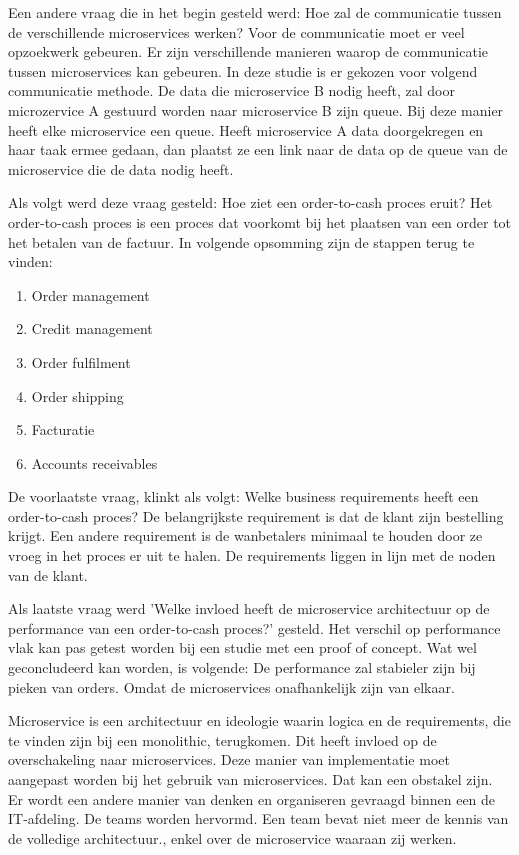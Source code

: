 Een andere vraag die in het begin gesteld werd: Hoe zal de communicatie tussen de verschillende microservices werken?
Voor de communicatie moet er veel opzoekwerk gebeuren. Er zijn verschillende manieren waarop de communicatie tussen microservices kan gebeuren. In deze studie is er gekozen voor volgend communicatie methode. De data die microservice B nodig heeft, zal door microzervice A gestuurd worden naar microservice B zijn queue. Bij deze manier heeft elke microservice een queue. Heeft microservice A data doorgekregen en haar taak ermee gedaan, dan plaatst ze een link naar de data op de queue van de microservice die de data nodig heeft. 

Als volgt werd deze vraag gesteld: Hoe ziet een order-to-cash proces eruit? 
Het order-to-cash proces is een proces dat voorkomt bij het plaatsen van een order tot het betalen van de factuur. In volgende opsomming zijn de stappen terug te vinden:
\begin{enumerate}
	\item Order management
	\item Credit management
	\item Order fulfilment
	\item Order shipping
	\item Facturatie
	\item Accounts receivables
\end{enumerate}

De voorlaatste vraag, klinkt als volgt: Welke business requirements heeft een order-to-cash proces?
De belangrijkste requirement is dat de klant zijn bestelling krijgt. Een andere requirement is de wanbetalers minimaal te houden door ze vroeg in het proces er uit te halen. De requirements liggen in lijn met de noden van de klant.

Als laatste vraag werd 'Welke invloed heeft de microservice architectuur op de performance van een order-to-cash proces?' gesteld.
Het verschil op performance vlak kan pas getest worden bij een studie met een proof of concept. Wat wel geconcludeerd kan worden, is volgende: De performance zal stabieler zijn bij pieken van orders. Omdat de microservices onafhankelijk zijn van elkaar.


Microservice is een architectuur en ideologie waarin logica en de requirements, die te vinden zijn bij een monolithic, terugkomen. Dit heeft invloed op de overschakeling naar microservices. Deze manier van implementatie moet aangepast worden bij het gebruik van microservices. Dat kan een obstakel zijn. Er wordt een andere manier van denken en organiseren gevraagd binnen een de IT-afdeling. De teams worden hervormd. Een team bevat niet meer de kennis van de volledige architectuur., enkel over de microservice waaraan zij werken. 


